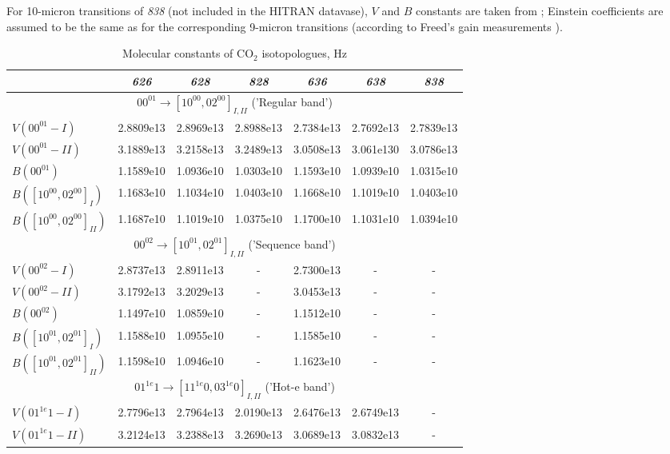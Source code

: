\documentclass{report}
\begin{document}
\begin{appendices}
For 10-micron transitions of \textit{838} (not included in the HITRAN datavase), $V$ and $B$ constants are taken from \cite{Maki-1994}; Einstein coefficients are assumed to be the same as for the corresponding 9-micron transitions (according to Freed's gain measurements \cite{Freed-1982}).


\begin{sidewaystable}
\centering
\caption{Molecular constants of CO$_2$ isotopologues, Hz}
\label{table:VB}
\footnotesize
\begin{tabular}{|l|cccccc|}
\hline
& \textit{626} & \textit{628} & \textit{828} & \textit{636} & \textit{638} & \textit{838}\\
\hline
\multicolumn{7}{|c|}{$00^01\rightarrow[10^00,02^00]_{I,II}$ ('Regular band')}\\
\hline
$V(00^01-I)$            & 2.8809e13 & 2.8969e13 & 2.8988e13 & 2.7384e13 & 2.7692e13 & 2.7839e13\\
$V(00^01-II)$           & 3.1889e13 & 3.2158e13 & 3.2489e13 & 3.0508e13 & 3.061e130 & 3.0786e13\\
$B(00^01)$              & 1.1589e10 & 1.0936e10 & 1.0303e10 & 1.1593e10 & 1.0939e10 & 1.0315e10\\
$B([10^00,02^00]_I)$    & 1.1683e10 & 1.1034e10 & 1.0403e10 & 1.1668e10 & 1.1019e10 & 1.0403e10\\
$B([10^00,02^00]_{II})$ & 1.1687e10 & 1.1019e10 & 1.0375e10 & 1.1700e10 & 1.1031e10 & 1.0394e10\\
\hline
\multicolumn{7}{|c|}{$00^02\rightarrow[10^01,02^01]_{I,II}$ ('Sequence band')}\\
\hline
$V(00^02-I)$            & 2.8737e13 & 2.8911e13 & - & 2.7300e13 & - & -\\
$V(00^02-II)$           & 3.1792e13 & 3.2029e13 & - & 3.0453e13 & - & -\\
$B(00^02)$              & 1.1497e10 & 1.0859e10 & - & 1.1512e10 & - & -\\
$B([10^01,02^01]_I)$    & 1.1588e10 & 1.0955e10 & - & 1.1585e10 & - & -\\
$B([10^01,02^01]_{II})$ & 1.1598e10 & 1.0946e10 & - & 1.1623e10 & - & -\\
\hline
\multicolumn{7}{|c|}{$01^{1e}1\rightarrow[11^{1e}0,03^{1e}0]_{I,II}$ ('Hot-e band')}\\
\hline
$V(01^{1e}1-I)$               & 2.7796e13 & 2.7964e13 & 2.0190e13 & 2.6476e13 & 2.6749e13 & -\\
$V(01^{1e}1-II)$              & 3.2124e13 & 3.2388e13 & 3.2690e13 & 3.0689e13 & 3.0832e13 & -\\

\end{tabular}
\end{sidewaystable}
\end{appendices}
\end{document}

